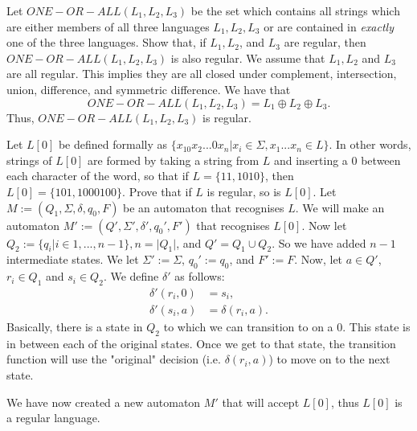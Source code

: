 \documentclass{article}
\begin{document}
\begin{question}{2}{
        Let $ONE-OR-ALL(L_1, L_2, L_3)$ be the set which contains all strings which are
        either members of all three languages $L_1, L_2, L_3$ or are contained in
        \emph{exactly} one of the three languages. Show that, if $L_1, L_2$, and $L_3$ are
        regular, then $ONE-OR-ALL(L_1, L_2, L_3)$ is also regular.
    }
    We assume that $L_1, L_2$ and $L_3$ are all regular. This implies they are all
    closed under complement, intersection, union, difference, and symmetric
    difference. We have that
    \[ONE-OR-ALL(L_1, L_2, L_3) = L_1 \oplus L_2 \oplus L_3.\]
    Thus, $ONE-OR-ALL(L_1, L_2, L_3)$ is regular.
\end{question}

\begin{question}{3}{
        Let $L[0]$ be defined formally as $\{x_10x_2...0x_n | x_i \in \Sigma, x_1...x_n\in L\}$.
        In other words, strings of $L[0]$ are formed by taking a string from $L$
        and inserting a $0$ between each character of the word, so that if $L = \{11,1010\}$,
        then $L[0] = \{101, 1000100\}$.  Prove that if $L$ is regular, so is $L[0]$.
    }
    Let $M := (Q_1, \Sigma, \delta, q_0, F)$ be an automaton that recognises $L$. We will
    make an automaton $M' := (Q', \Sigma', \delta', q_0', F')$ that recognises $L[0]$. Now let
    $Q_2 := \{q_i | i \in 1,...,n-1\}, n = |Q_1|$, and $Q' = Q_1 \cup Q_2$. So we have added $n-1$
    intermediate states. We let $\Sigma' := \Sigma$, $q_0' := q_0$, and $F' := F$.
    Now, let $a \in Q'$, $r_i \in Q_1$ and $s_i \in Q_2$. We define $\delta'$ as follows:
    \begin{align*}
        \delta'(r_i, 0) & = s_i,            \\
        \delta'(s_i, a) & = \delta(r_i, a).
    \end{align*}
    Basically, there is a state in $Q_2$ to which we can transition to on a 0.
    This state is in between each
    of the original states. Once we get to that state, the transition function will use the
    "original" decision (i.e. $\delta(r_i, a)$) to move on to the next state.

    We have now created a new automaton $M'$ that will accept $L[0]$, thus $L[0]$ is a
    regular language.
\end{question}
\end{document}
